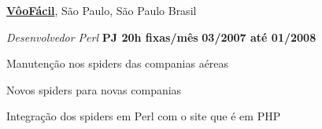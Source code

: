 \documentclass[10pt]{article}
\newenvironment{outerlist}[1][\enskip\textbullet]%
        {\begin{itemize}[#1]}{\end{itemize}%
         \vspace{-.6\baselineskip}}
\newenvironment{innerlist}[1][\enskip\textbullet]%
        {\begin{compactitem}[#1]}{\end{compactitem}}
\begin{document}
\href{http://www.voofacil.com/}{\textbf{VôoFácil}}, 
São Paulo, São Paulo Brasil
\begin{outerlist}
\item[] \textit{Desenvolvedor Perl}%
	\hfill \textbf{PJ 20h fixas/mês}
        \hfill \textbf{03/2007 até 01/2008}
\begin{innerlist}
\item Manutenção nos spiders das companias aéreas
\item Novos spiders para novas companias
\item Integração dos spiders em Perl com o site que é em PHP
\end{innerlist}

\end{outerlist}
\end{document}
